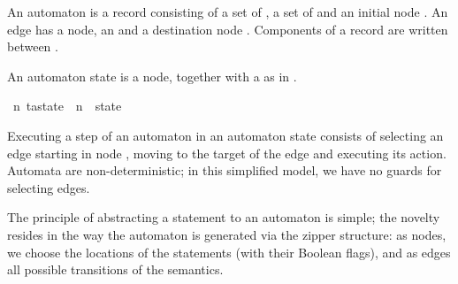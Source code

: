 \begin{isabellebody}
\begin{isamarkuptext}
An automaton  is a record consisting of a set of , a set of  and an initial node . An edge has a  node, an  and a destination node . Components of a record are written between \isa{{\isasymlparr}\ {\isachardot}{\isachardot}{\isachardot}\ {\isasymrparr}}.\end{isamarkuptext}\isamarkuptrue {}
\isamarkuptrue \begin{isamarkuptext}An automaton state is a node, together with a  as in .\end{isamarkuptext}\isamarkuptrue {}\isamarkupfalse \ {\isacharprime}n\ ta{\isacharunderscore}state\ {\isacharequal}\ {\isachardoublequoteopen}{\isacharprime}n\ {\isacharasterisk}\ state{\isachardoublequoteclose}\begin{isamarkuptext}Executing a step of an automaton in an automaton state  consists of selecting an edge starting in node , moving to the
target of the edge and executing its action. Automata are
non-deterministic; in this simplified model, we have no guards for selecting
edges.

\begin{center}
\end{center}\end{isamarkuptext}\isamarkuptrue {}
\isamarkuptrue \begin{isamarkuptext}The principle of abstracting a statement to an automaton is simple;
the novelty resides in the way the automaton is generated via the zipper
structure: as nodes, we choose the locations of the statements (with their
Boolean flags), and as edges all possible transitions of the semantics.


\end{isamarkuptext}
\end{isabellebody}
